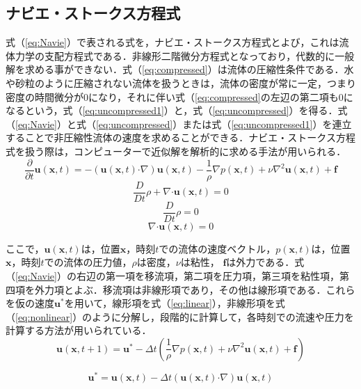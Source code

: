 \documentclass[a4j,12pt]{jreport}
\begin{document}
\subsection{ナビエ・ストークス方程式} \label{subsec:nabie}
式（\ref{eq:Navie}）で表される式を，ナビエ・ストークス方程式とよび，これは流体力学の支配方程式である．非線形二階微分方程式となっており，代数的に一般解を求める事ができない．式（\ref{eq:compressed}）は流体の圧縮性条件である．水や砂粒のように圧縮されない流体を扱うときは，流体の密度が常に一定，つまり密度の時間微分が0になり，それに伴い式（\ref{eq:compressed}の左辺の第二項も0になるという，式（\ref{eq:uncompressed1}）と，式（\ref{eq:uncompressed}）を得る．式（\ref{eq:Navie}）と式（\ref{eq:uncompressed}）または式（\ref{eq:uncompressed1}）を連立することで非圧縮性流体の速度を求めることができる．ナビエ・ストークス方程式を扱う際は，コンピューターで近似解を解析的に求める手法が用いられる．
\begin{equation}\label{eq:Navie}
\frac{\partial}{\partial t}\bm{u}(\bm{x},t) = -(\bm{u}(\bm{x},t) \boldsymbol{\cdot}\nabla)\bm{u}(\bm{x},t)  - \frac{1}{\rho}\nabla p(\bm{x},t) + \nu\nabla^2\bm{u}(\bm{x},t) + \bm{f}
\end{equation}
\begin{equation}\label{eq:compressed}
\frac{D}{Dt}\rho + \nabla\boldsymbol{\cdot}\bm{u}(\bm{x},t) = 0
\end{equation}
\begin{equation}\label{eq:uncompressed1}
\frac{D}{Dt}\rho  = 0
\end{equation}
\begin{equation}\label{eq:uncompressed}
\nabla\boldsymbol{\cdot}\bm{u}(\bm{x},t) = 0
\end{equation}

ここで，$\bm{u}(\bm{x},t)$は，位置$\bm{x}$，時刻$t$での流体の速度ベクトル，$p(\bm{x},t)$は，位置$\bm{x}$，時刻$t$での流体の圧力値，$\rho$は密度，$\nu$は粘性， $\bm{f}$は外力である．式（\ref{eq:Navie}）の右辺の第一項を移流項，第二項を圧力項，第三項を粘性項，第四項を外力項とよぶ．移流項は非線形項であり，その他は線形項である．これらを仮の速度$\bm{u}^*$を用いて，線形項を式（\ref{eq:linear}），非線形項を式（\ref{eq:nonlinear}）のように分解し，段階的に計算して，各時刻での流速や圧力を計算する方法が用いられている．
\begin{equation}\label{eq:linear}
\bm{u}(\bm{x},t+1) =  \bm{u}^* - \Delta t(\frac{1}{\rho}\nabla p(\bm{x},t) + \nu\nabla^2\bm{u}(\bm{x},t) + \bm{f})
\end{equation} 

\begin{equation}\label{eq:nonlinear}
\bm{u}^* = \bm{u}(\bm{x},t) - \Delta t(\bm{u}(\bm{x},t) \boldsymbol{\cdot}\nabla)\bm{u}(\bm{x},t) 
\end{equation}
\end{document}
